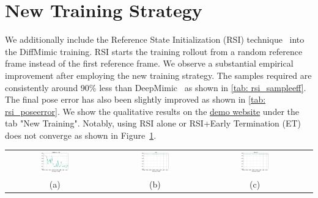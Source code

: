 \section{{New Training Strategy}}
We additionally include the Reference State Initialization (RSI) technique~\citep{peng2018deepmimic} into the DiffMimic training. RSI starts the training rollout from a random reference frame instead of the first reference frame. We observe a substantial empirical improvement after employing the new training strategy. The samples required are consistently around 90\% less than DeepMimic~\citep{peng2018deepmimic} as shown in \autoref{tab: rsi_sampleeff}. The final pose error has also been slightly improved as shown in \autoref{tab: rsi_poseerror}. We show the qualitative results on the \href{https://diffmimic-demo-main-g7h0i8.streamlit.app/}{demo website} under the tab "New Training". Notably, using RSI alone or RSI+Early Termination (ET)~\citep{peng2018deepmimic} does not converge as shown in Figure~\ref{tab:rsi-curve}.



\begin{table}[]
    \centering
    \begin{tabular}{cccc}
    \includegraphics[width=0.3\textwidth]{figures/rebuttal/DiffMimic_RSI.pdf}&
    \includegraphics[width=0.3\textwidth]{figures/rebuttal/RSI.pdf}&
    \includegraphics[width=0.3\textwidth]{figures/rebuttal/RSI_ET.pdf}&
    \\
    (a)
    &
    (b)
    &
    (c)
    \end{tabular}
    \label{tab:rsi-curve}
\end{table}

